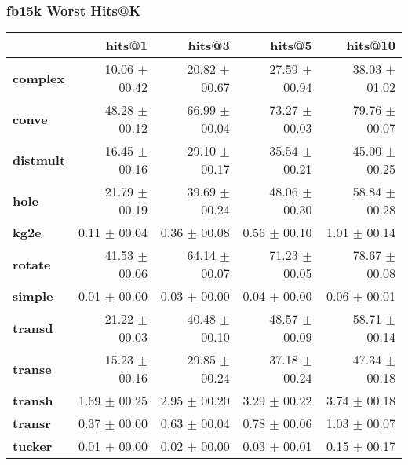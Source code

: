 \documentclass{article}
\begin{document}
\subsubsection{fb15k Worst Hits@K}
    \begin{center}
    \begin{tabular}{lrrrr}
\toprule
{} &         hits@1 &         hits@3 &         hits@5 &        hits@10 \\
\midrule
\textbf{complex } &  10.06 $\pm$ 00.42 &  20.82 $\pm$ 00.67 &  27.59 $\pm$ 00.94 &  38.03 $\pm$ 01.02 \\
\textbf{conve   } &  48.28 $\pm$ 00.12 &  66.99 $\pm$ 00.04 &  73.27 $\pm$ 00.03 &  79.76 $\pm$ 00.07 \\
\textbf{distmult} &  16.45 $\pm$ 00.16 &  29.10 $\pm$ 00.17 &  35.54 $\pm$ 00.21 &  45.00 $\pm$ 00.25 \\
\textbf{hole    } &  21.79 $\pm$ 00.19 &  39.69 $\pm$ 00.24 &  48.06 $\pm$ 00.30 &  58.84 $\pm$ 00.28 \\
\textbf{kg2e    } &   0.11 $\pm$ 00.04 &   0.36 $\pm$ 00.08 &   0.56 $\pm$ 00.10 &   1.01 $\pm$ 00.14 \\
\textbf{rotate  } &  41.53 $\pm$ 00.06 &  64.14 $\pm$ 00.07 &  71.23 $\pm$ 00.05 &  78.67 $\pm$ 00.08 \\
\textbf{simple  } &   0.01 $\pm$ 00.00 &   0.03 $\pm$ 00.00 &   0.04 $\pm$ 00.00 &   0.06 $\pm$ 00.01 \\
\textbf{transd  } &  21.22 $\pm$ 00.03 &  40.48 $\pm$ 00.10 &  48.57 $\pm$ 00.09 &  58.71 $\pm$ 00.14 \\
\textbf{transe  } &  15.23 $\pm$ 00.16 &  29.85 $\pm$ 00.24 &  37.18 $\pm$ 00.24 &  47.34 $\pm$ 00.18 \\
\textbf{transh  } &   1.69 $\pm$ 00.25 &   2.95 $\pm$ 00.20 &   3.29 $\pm$ 00.22 &   3.74 $\pm$ 00.18 \\
\textbf{transr  } &   0.37 $\pm$ 00.00 &   0.63 $\pm$ 00.04 &   0.78 $\pm$ 00.06 &   1.03 $\pm$ 00.07 \\
\textbf{tucker  } &   0.01 $\pm$ 00.00 &   0.02 $\pm$ 00.00 &   0.03 $\pm$ 00.01 &   0.15 $\pm$ 00.17 \\
\bottomrule
\end{tabular}

    \end{center}
\end{document}
